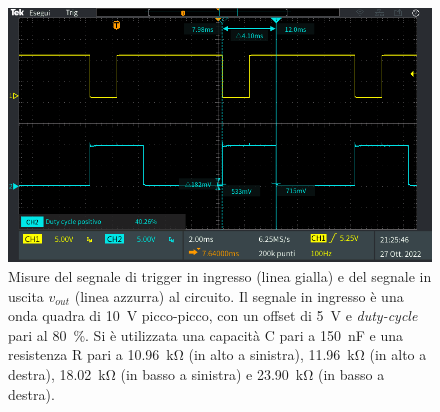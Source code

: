 \begin{figure}[h]
\begin{minipage}{.496\textwidth}
	\end{minipage}
	\begin{minipage}{.496\textwidth}
		\includegraphics[width=\linewidth]{./ImageFiles/Laboratorio 4/TEK00020.PNG}
	\end{minipage}
	\caption{Misure del segnale di trigger in ingresso (linea gialla) e del segnale in uscita $v_{out}$ (linea azzurra) al circuito. Il segnale in ingresso è una onda quadra di \SI{10}{\volt} picco-picco, con un offset di \SI{5}{\volt} e \textit{duty-cycle} pari al \SI{80}{\percent}. Si è utilizzata una capacità C pari a \SI{150}{\nano\farad} e una resistenza R pari a \SI{10,96}{\kilo\ohm} (in alto a sinistra), \SI{11,96}{\kilo\ohm} (in alto a destra), \SI{18,02}{\kilo\ohm} (in basso a sinistra) e \SI{23,90}{\kilo\ohm} (in basso a destra).}
	\label{fig:uscita_circuito_150n}
\end{figure}

